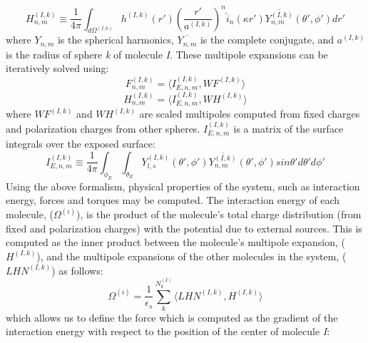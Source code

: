 \documentclass[12pt,titlepage]{article}
\begin{document}
%
\begin{equation}
H_{n,m}^{(I,k)} \equiv  \frac{1}{4\pi} \int_{d\Omega^{(I,k)}} h^{(I,k)}(r') \left (  \frac{ r'}{a^{(I,k)}} \right ) ^{n} \hat{i}_n(\kappa r') \overline{ Y^{(I,k)}_{n,m}} (\theta' , \phi') dr'
\label{eq:hmat}
\end{equation}
%
where \(Y_{n,m}\) is the spherical harmonics, $\overline{Y_{n,m}}$ is the complete conjugate, and \(a^{(I,k)}\) is the radius of sphere \textit{k} of molecule \textit{I}. These multipole expansions can be iteratively solved using:
%
\begin{equation}
F_{n,m}^{(I,k)} = \langle I_{E, n,m} ^{(I,k)}, WF^{(I,k)} \rangle
\label{eq:fmat_it}
\end{equation}
%
\begin{equation}
H_{n,m}^{(I,k)} = \langle I_{E, n,m} ^{(I,k)}, WH^{(I,k)} \rangle
\label{eq:hmat_it}
\end{equation}
%
where $WF^{(I,k)}$ and $WH^{(I,k)}$ are scaled multipoles computed from fixed charges and polarization charges from other spheres. \(I_{E,n,m}^{(I,k)}\) is a matrix of the surface integrals over the exposed surface:
%
\begin{equation}
I_{E, n,m} ^{(I,k)} \equiv \frac{1}{4\pi } \int_{\phi_E} \int_{\theta_E} Y_{l,s}^{(I,k)}  (\theta', \phi') \overline{Y_{n,m}^{(I,k)}} (\theta', \phi') sin \theta' d\theta' d \phi' 
\label{eq:imat}
\end{equation}
%
Using the above formalism, physical properties of the system, such as interaction energy, forces and torques may be computed. The interaction energy of each molecule, ($\Omega^{(i)}$), is the product of the molecule's total charge distribution (from fixed and polarization charges) with the potential due to external sources. This is computed as the inner product between the molecule's multipole expansion, ($H^{(I,k)}$), and the multipole expansions of the other molecules in the system, ($LHN^{(I,k)}$) as follows:
%
\begin{equation}
\Omega^{(i)} = \frac{1}{\epsilon_s} \sum_{k}^{N_k^{(I)}}  \langle LHN^{(I,k)}, H^{(I,k)} \rangle
\label{eq:pbsam_en_interact}
\end{equation}
%
which allows us to define the force which is computed as the gradient of the interaction energy with respect to the position of the center of molecule \textit{I}:
\end{document}
